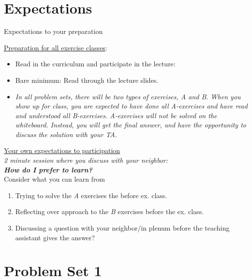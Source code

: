 \section{Expectations}

\begin{frame}{Expectations to your preparation}
\begin{multicols}{2}
\underline{Preparation for all exercise classes}:
\begin{itemize}
  \item Read in the curriculum and participate in the lecture:
  \item Bare minimum: Read through the lecture slides.
  \item \textit{In all problem sets, there will be two types of exercises, A and B. When you show up for class, you are expected to have done all A-exercises and have read and understood all B-exercises. A-exercises will not be solved on the whiteboard. Instead, you will get the final answer, and have the opportunity to discuss the solution with your TA.}
\end{itemize}
\columnbreak
\underline{Your own expectations to participation}
\\ \medskip
\textit{2 minute session where you discuss with your neighbor:}
\\ \medskip
\textbf{\textit{How do I prefer to learn?}}
\\ \medskip
Consider what you can learn from
\begin{enumerate}
  \item Trying to solve the \textit{A} exercises the before ex. class.
  \item Reflecting over approach to the \textit{B} exercises before the ex. class.
  \item Discussing a question with your neighbor/in plenum before the teaching assistant gives the answer?
\end{enumerate}
\end{multicols}
\end{frame}


\section{Problem Set 1}




